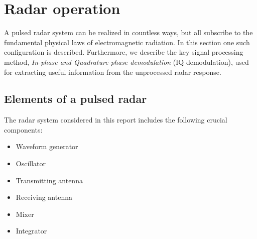 












\section{Radar operation}

A pulsed radar system can be realized in countless ways, but all subscribe to the fundamental physical laws of electromagnetic radiation. In this section one such configuration is described. Furthermore, we describe the key signal processing method, \emph{In-phase and Quadrature-phase demodulation} (IQ demodulation), used for extracting useful information from the unprocessed radar response. 

\subsection{Elements of a pulsed radar}
The radar system considered in this report includes the following crucial components:

\begin{itemize}
	\item Waveform generator
	\item Oscillator
	\item Transmitting antenna
	\item Receiving antenna
	\item Mixer
	\item Integrator
\end{itemize}

